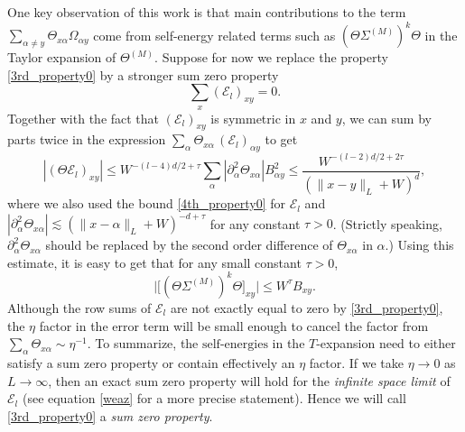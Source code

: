 \documentclass{article}
\newcommand{\1}{\mathds{1}}
\numberwithin{equation}{section}
\newcommand{\al}{\alpha}
\newcommand{\be}{\begin{equation}}
\newcommand{\ee}{\end{equation}}
\renewcommand{\leq}{\leqslant}
\renewcommand{\le}{\leq}
\newcommand{\selfs}{\text{self-energies}}
\newcommand{\renormal}{\text{self-energy renormalization}}
\theoremstyle{plain} %
\theoremstyle{remark}
\newcommand{\cor}{\color{red}}
\newcommand{\wtSdelta}{\Sigma}
\newcommand{\Sele}{{\mathcal E}}
\newcommand{\hty}[1]{{\cor (ht: #1) }}
\begin{document}
One key observation of this work is that main contributions to the term  $\sum_{\al \ne y}\Theta_{x \al}\Omega_{\al y}$ come from  self-energy related terms such as  $ (\Theta \wtSdelta^{(M)})^k \Theta$ in the Taylor expansion of $\Theta^{(M)}$. Suppose for now we replace the property \eqref{3rd_property0} by a stronger sum zero property
\be\label{pseduo_sum_zero} \sum_{x} (\Sele_l)_{xy} =0 .\ee
Together with the fact that $(\Sele_l)_{xy}$ is symmetric in $x$ and $y$, we can sum by parts twice in the expression 
$\sum_\al \Theta_{x\al}\, (\Sele_l)_{\al y}$  to get 
\be\label{label_Theta}
\left|(\Theta \Sele_l)_{x y}\right| \le  W^{-(l-4)d/2+\tau}  \sum_{\alpha} \left|\partial_{\alpha }^2 \Theta_{x \alpha }\right|B_{\al y}^2 \le \frac{W^{-(l-2)d/2+2\tau}}{\left(\|x-y\|_{ L}+W\right)^{d}},
\ee 
where we also used the bound \eqref{4th_property0} for $\Sele_l$ 
and $ | \partial_\al^2 \Theta_{x \al} | \lesssim \left(\|x-\al\|_{ L}+W\right)^{-d+\tau}$ for any constant $\tau>0$. 
(Strictly speaking, $\partial_{\alpha }^2 \Theta_{x \alpha }$ should be replaced by the second order difference of  $ \Theta_{x \alpha }$ in $\alpha$.)  Using this estimate, it is easy to get that for any small constant $\tau>0$,  
\be \Big|\big[(\Theta \wtSdelta^{(M)})^k \Theta\big]_{xy}\Big| \le W^{\tau} B_{xy}. \ee %
Although the row sums of $\Sele_l$ are not exactly equal to zero by \eqref{3rd_property0}, the $\eta$ factor in the error term will be small enough to cancel the factor from $\sum_\al \Theta_{x \al}\sim \eta^{-1}$. To summarize, the $\selfs$ in the $T$-expansion need to either satisfy a sum zero property or contain effectively an $\eta$ factor. 
If we take $\eta\to 0$ as $L\to\infty$, then an exact sum zero property will hold for the \emph{infinite space limit} of $\Sele_l$ (see equation \eqref{weaz} for a more precise statement). 
Hence we will call \eqref{3rd_property0} a \emph{sum zero property}. 

 
\end{document}
